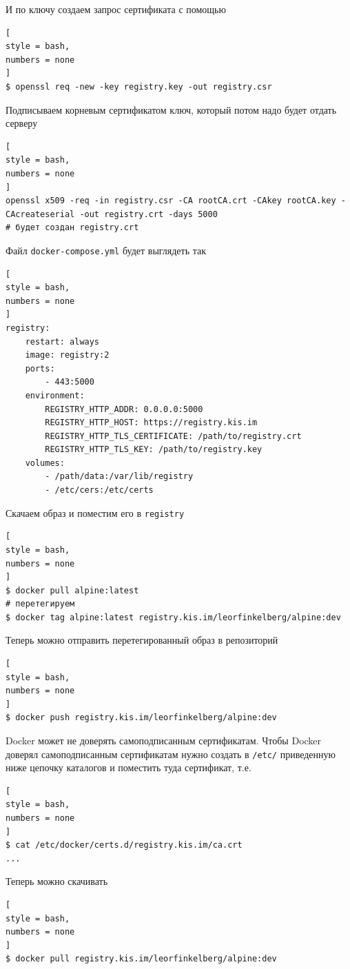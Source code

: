 \documentclass[%
	11pt,
	a4paper,
	utf8,
		]{article}
\begin{document}
И по ключу создаем запрос сертификата с помощью
\begin{lstlisting}[
style = bash,
numbers = none
]
$ openssl req -new -key registry.key -out registry.csr
\end{lstlisting}

Подписываем корневым сертификатом ключ, который потом надо будет отдать серверу
\begin{lstlisting}[
style = bash,
numbers = none
]
openssl x509 -req -in registry.csr -CA rootCA.crt -CAkey rootCA.key -CAcreateserial -out registry.crt -days 5000
# будет создан registry.crt
\end{lstlisting}

Файл \texttt{docker-compose.yml} будет выглядеть так
\begin{lstlisting}[
style = bash,
numbers = none
]
registry:
    restart: always
    image: registry:2
    ports:
        - 443:5000
    environment:
        REGISTRY_HTTP_ADDR: 0.0.0.0:5000
        REGISTRY_HTTP_HOST: https://registry.kis.im
        REGISTRY_HTTP_TLS_CERTIFICATE: /path/to/registry.crt
        REGISTRY_HTTP_TLS_KEY: /path/to/registry.key
    volumes:
        - /path/data:/var/lib/registry
        - /etc/cers:/etc/certs
\end{lstlisting}

Скачаем образ и поместим его в \texttt{registry}
\begin{lstlisting}[
style = bash,
numbers = none
]
$ docker pull alpine:latest
# перетегируем
$ docker tag alpine:latest registry.kis.im/leorfinkelberg/alpine:dev
\end{lstlisting}

Теперь можно отправить перетегированный образ в репозиторий
\begin{lstlisting}[
style = bash,
numbers = none
]
$ docker push registry.kis.im/leorfinkelberg/alpine:dev
\end{lstlisting}

Docker может не доверять самоподписанным сертификатам. Чтобы Docker доверял самоподписанным сертификатам нужно создать в \verb|/etc/| приведенную ниже цепочку каталогов и поместить туда сертификат, т.е.
\begin{lstlisting}[
style = bash,
numbers = none
]
$ cat /etc/docker/certs.d/registry.kis.im/ca.crt
...
\end{lstlisting}

Теперь можно скачивать
\begin{lstlisting}[
style = bash,
numbers = none
]
$ docker pull registry.kis.im/leorfinkelberg/alpine:dev
\end{lstlisting}
\end{document}
